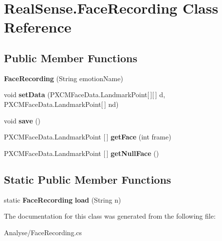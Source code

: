 \section{Real\+Sense.\+Face\+Recording Class Reference}
\label{class_real_sense_1_1_face_recording}
\subsection*{Public Member Functions}
\begin{DoxyCompactItemize}
\item 
\mbox{\label{class_real_sense_1_1_face_recording_a06fe1ad41d77cd359dd583c70d1f6e35}} 
{\bfseries Face\+Recording} (String emotion\+Name)
\item 
\mbox{\label{class_real_sense_1_1_face_recording_a94e9208ed4f1fe15264ab3b2293f3ce4}} 
void {\bfseries set\+Data} (P\+X\+C\+M\+Face\+Data.\+Landmark\+Point[$\,$][$\,$] d, P\+X\+C\+M\+Face\+Data.\+Landmark\+Point[$\,$] nd)
\item 
\mbox{\label{class_real_sense_1_1_face_recording_aab0ad08e511ae94dbabe32a483a395ca}} 
void {\bfseries save} ()
\item 
\mbox{\label{class_real_sense_1_1_face_recording_a8a5e0b5187f8f71e490c612289df757f}} 
P\+X\+C\+M\+Face\+Data.\+Landmark\+Point [$\,$] {\bfseries get\+Face} (int frame)
\item 
\mbox{\label{class_real_sense_1_1_face_recording_adb306111dec190d5852088978ea2459e}} 
P\+X\+C\+M\+Face\+Data.\+Landmark\+Point [$\,$] {\bfseries get\+Null\+Face} ()
\end{DoxyCompactItemize}
\subsection*{Static Public Member Functions}
\begin{DoxyCompactItemize}
\item 
\mbox{\label{class_real_sense_1_1_face_recording_a61d844c987701d6a21c0ce83333bdf14}} 
static \textbf{ Face\+Recording} {\bfseries load} (String n)
\end{DoxyCompactItemize}


The documentation for this class was generated from the following file\+:\begin{DoxyCompactItemize}
\item 
Analyse/Face\+Recording.\+cs\end{DoxyCompactItemize}
